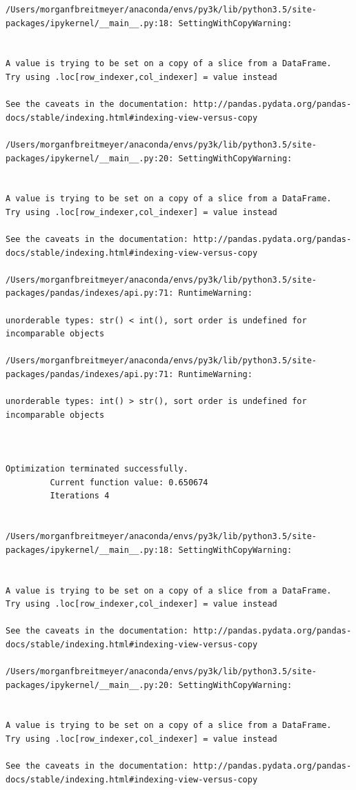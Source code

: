 \begin{lstlisting}
/Users/morganfbreitmeyer/anaconda/envs/py3k/lib/python3.5/site-packages/ipykernel/__main__.py:18: SettingWithCopyWarning:


A value is trying to be set on a copy of a slice from a DataFrame.
Try using .loc[row_indexer,col_indexer] = value instead

See the caveats in the documentation: http://pandas.pydata.org/pandas-docs/stable/indexing.html#indexing-view-versus-copy

/Users/morganfbreitmeyer/anaconda/envs/py3k/lib/python3.5/site-packages/ipykernel/__main__.py:20: SettingWithCopyWarning:


A value is trying to be set on a copy of a slice from a DataFrame.
Try using .loc[row_indexer,col_indexer] = value instead

See the caveats in the documentation: http://pandas.pydata.org/pandas-docs/stable/indexing.html#indexing-view-versus-copy

/Users/morganfbreitmeyer/anaconda/envs/py3k/lib/python3.5/site-packages/pandas/indexes/api.py:71: RuntimeWarning:

unorderable types: str() < int(), sort order is undefined for incomparable objects

/Users/morganfbreitmeyer/anaconda/envs/py3k/lib/python3.5/site-packages/pandas/indexes/api.py:71: RuntimeWarning:

unorderable types: int() > str(), sort order is undefined for incomparable objects



Optimization terminated successfully.
         Current function value: 0.650674
         Iterations 4


/Users/morganfbreitmeyer/anaconda/envs/py3k/lib/python3.5/site-packages/ipykernel/__main__.py:18: SettingWithCopyWarning:


A value is trying to be set on a copy of a slice from a DataFrame.
Try using .loc[row_indexer,col_indexer] = value instead

See the caveats in the documentation: http://pandas.pydata.org/pandas-docs/stable/indexing.html#indexing-view-versus-copy

/Users/morganfbreitmeyer/anaconda/envs/py3k/lib/python3.5/site-packages/ipykernel/__main__.py:20: SettingWithCopyWarning:


A value is trying to be set on a copy of a slice from a DataFrame.
Try using .loc[row_indexer,col_indexer] = value instead

See the caveats in the documentation: http://pandas.pydata.org/pandas-docs/stable/indexing.html#indexing-view-versus-copy


\end{lstlisting}
